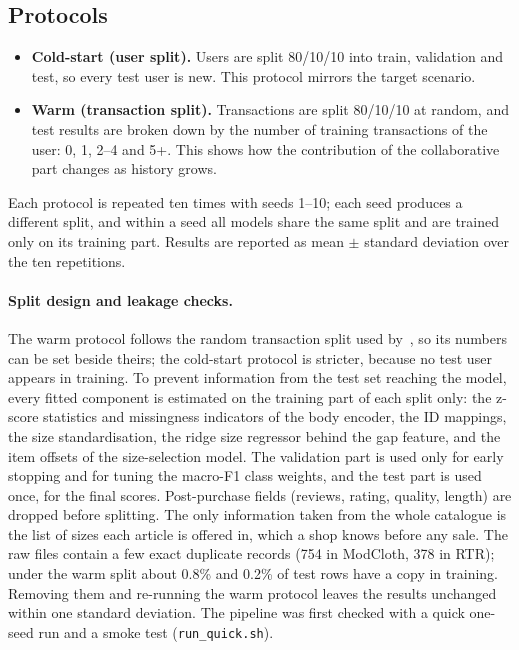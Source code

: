 \subsection{Protocols}
\begin{itemize}
\item \textbf{Cold-start (user split).} Users are split 80/10/10 into train, validation and test, so every test user is new. This protocol mirrors the target scenario.
\item \textbf{Warm (transaction split).} Transactions are split 80/10/10 at random, and test results are broken down by the number of training transactions of the user: 0, 1, 2--4 and 5+. This shows how the contribution of the collaborative part changes as history grows.
\end{itemize}
Each protocol is repeated ten times with seeds 1--10; each seed produces a different split, and within a seed all models share the same split and are trained only on its training part. Results are reported as mean $\pm$ standard deviation over the ten repetitions.

\paragraph{Split design and leakage checks.} The warm protocol follows the random transaction split used by~\cite{misra2018fit,sheikh2019sfnet}, so its numbers can be set beside theirs; the cold-start protocol is stricter, because no test user appears in training. To prevent information from the test set reaching the model, every fitted component is estimated on the training part of each split only: the z-score statistics and missingness indicators of the body encoder, the ID mappings, the size standardisation, the ridge size regressor behind the gap feature, and the item offsets of the size-selection model. The validation part is used only for early stopping and for tuning the macro-F1 class weights, and the test part is used once, for the final scores. Post-purchase fields (reviews, rating, quality, length) are dropped before splitting. The only information taken from the whole catalogue is the list of sizes each article is offered in, which a shop knows before any sale. The raw files contain a few exact duplicate records (754 in ModCloth, 378 in RTR); under the warm split about 0.8\% and 0.2\% of test rows have a copy in training. Removing them and re-running the warm protocol leaves the results unchanged within one standard deviation. The pipeline was first checked with a quick one-seed run and a smoke test (\texttt{run\_quick.sh}).

